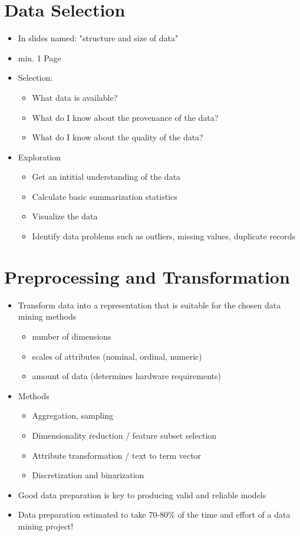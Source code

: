 \chapter{Data Selection}
\label{cha:data_selection}
\begin{itemize}
	\item In slides named: "structure and size of data"
	\item min. 1 Page
	\item Selection: 
	\begin{itemize}
		\item What data is available?
		\item What do I know about the provenance of the data?
		\item What do I know about the quality of the data?
	\end{itemize}
	\item Exploration
	\begin{itemize}
		\item Get an intitial understanding of the data
		\item Calculate basic summarization statistics
		\item Visualize the data
		\item Identify data problems such as outliers, missing values, duplicate records
	\end{itemize}
\end{itemize}



\chapter{Preprocessing and Transformation}
\label{cha:preprocessing_transformation}
\begin{itemize}
	\item Transform data into a representation that is suitable for the chosen data mining methods
	\begin{itemize}
		\item number of dimensions
		\item scales of attributes (nominal, ordinal, numeric)
		\item amount of data (determines hardware requirements)
	\end{itemize}
	\item Methods
	\begin{itemize}
		\item Aggregation, sampling
		\item Dimensionality reduction / feature subset selection
		\item Attribute transformation / text to term vector
		\item Discretization and binarization
	\end{itemize}
	\item Good data preparation is key to producing valid and reliable models
	\item Data preparation estimated to take 70-80\% of the time and effort of a data mining project!
\end{itemize}



